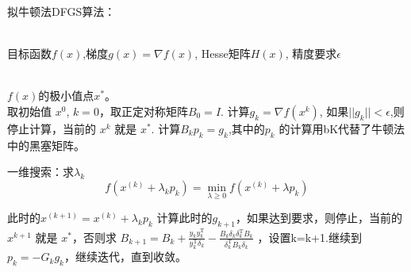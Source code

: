 \documentclass[UTF8]{ctexart}
\begin{document}
\begin{algorithm}[h] 
	\caption{ 拟牛顿法DFGS算法：} 
	\label{alg:Framwork3} 
	\begin{algorithmic}[1] %
		\REQUIRE ~~\\ %
		目标函数$f(x)$,梯度$g(x)=\nabla f(x)$, Hesse矩阵$H(x)$, 精度要求$\epsilon$
		
		\ENSURE ~~\\ %
		$f(x)$的极小值点$x^*$。\\
		\STATE 取初始值 $x^0$, $k=0$，取正定对称矩阵$B_0 = I$.
		\STATE 计算$g_{k} = \nabla f(x^{k})$, 如果$||g_{k}|| < \epsilon $,则停止计算，当前的 $x^{k}$ 就是 $x^{*}$.
		\STATE 计算$B_k p_k =  g_k$,其中的$p_k$ 的计算用bK代替了牛顿法中的黑塞矩阵。
		
	
		\STATE 一维搜索：求$\lambda_k$ 
		$$
		f\left(x^{(k)}+\lambda_{k} p_{k}\right)=\min _{\lambda \geqslant 0} f\left(x^{(k)}+\lambda p_{k}\right)
		$$
		
		此时的$x^{(k+1)} = x^{(k)} + \lambda_k p_{k}$
		\STATE 计算此时的$g_{k+1}$，如果达到要求，则停止，当前的 $x^{k+1}$ 就是 $x^{*}$，否则求
		$B_{k+1}=B_{k}+\frac{y_{k} y_{k}^{\mathrm{T}}}{y_{k}^{\mathrm{T}} \delta_{k}}-\frac{B_{k} \delta_{k} \delta_{k}^{\mathrm{T}} B_{k}}{\delta_{k}^{\mathrm{T}} B_{k} \delta_{k}}
		$
		，设置k=k+1.继续到$p_k = -G_k g_k$，继续迭代，直到收敛。

	\end{algorithmic}
\end{algorithm}
\end{document}
